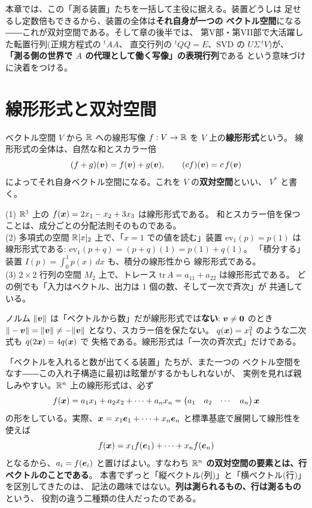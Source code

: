 本章では、この「測る装置」たちを一括して主役に据える。装置どうしは
足せるし定数倍もできるから、装置の全体は\textbf{それ自身が一つの
ベクトル空間}になる――これが双対空間である。そして章の後半では、
第V部・第VII部で大活躍した転置行列(正規方程式の ${}^t\!AA$、
直交行列の ${}^tQQ = E$、SVD の $U\Sigma\,{}^tV$)が、
\textbf{「測る側の世界で $A$ の代理として働く写像」の表現行列}である
という意味づけに決着をつける。

\section{線形形式と双対空間}

\begin{teigi}
ベクトル空間 $V$ から $\mathbb{R}$ への線形写像
$f : V \to \mathbb{R}$ を $V$ 上の\textbf{線形形式}という。
線形形式の全体は、自然な和とスカラー倍
\[
(f + g)(\bm{v}) = f(\bm{v}) + g(\bm{v}), \qquad
(cf)(\bm{v}) = c\,f(\bm{v})
\]
によってそれ自身ベクトル空間になる。これを $V$ の\textbf{双対空間}といい、
$V^{*}$ と書く。
\end{teigi}

\begin{rei}[線形形式の実例]\label{rei:dual-examples}
(1) $\mathbb{R}^3$ 上の $f(\bm{x}) = 2x_1 - x_2 + 3x_3$ は線形形式である。
和とスカラー倍を保つことは、成分ごとの分配法則そのものである。\\
(2) 多項式の空間 $\mathbb{R}[x]_2$ 上で、「$x = 1$ での値を読む」装置
$\mathrm{ev}_1(p) = p(1)$ は線形形式である:
$\mathrm{ev}_1(p + q) = (p + q)(1) = p(1) + q(1)$。
「積分する」装置 $I(p) = \int_0^1 p(x)\,dx$ も、積分の線形性から
線形形式である。\\
(3) $2 \times 2$ 行列の空間 $M_2$ 上で、トレース
$\mathrm{tr}\,A = a_{11} + a_{22}$ は線形形式である。
どの例でも「入力はベクトル、出力は $1$ 個の数、そして一次で斉次」が
共通している。
\end{rei}

\begin{chui}
ノルム $\|\bm{v}\|$ は「ベクトルから数」だが線形形式では\textbf{ない}:
$\bm{v} \neq \bm{0}$ のとき $\|-\bm{v}\| = \|\bm{v}\|
\neq -\|\bm{v}\|$ となり、スカラー倍を保たない。
$q(\bm{x}) = x_1^2$ のような二次式も $q(2\bm{x}) = 4q(\bm{x})$ で
失格である。線形形式は「一次の斉次式」だけである。
\end{chui}

「ベクトルを入れると数が出てくる装置」たちが、また一つの
ベクトル空間をなす――この入れ子構造に最初は眩暈がするかもしれないが、
実例を見れば親しみやすい。$\mathbb{R}^n$ 上の線形形式は、必ず
\[
f(\bm{x}) = a_1 x_1 + a_2 x_2 + \cdots + a_n x_n
= \begin{pmatrix}a_1 & a_2 & \cdots & a_n\end{pmatrix} \bm{x}
\]
の形をしている。実際、$\bm{x} = x_1\bm{e}_1 + \cdots + x_n\bm{e}_n$
と標準基底で展開して線形性を使えば
\[
f(\bm{x}) = x_1 f(\bm{e}_1) + \cdots + x_n f(\bm{e}_n)
\]
となるから、$a_i = f(\bm{e}_i)$ と置けばよい。すなわち
\textbf{$\mathbb{R}^n$ の双対空間の要素とは、行ベクトルのことである}。
本書でずっと「縦ベクトル(列)」と「横ベクトル(行)」を区別してきたのは、
記法の趣味ではない。\textbf{列は測られるもの、行は測るもの}という、
役割の違う二種類の住人だったのである。

